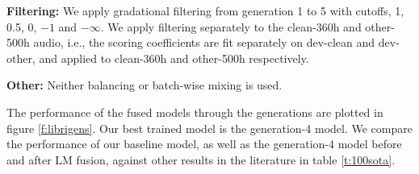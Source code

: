 \documentclass[a4paper]{article}
\begin{document}
\noindent\textbf{Filtering:} We apply gradational filtering from generation 1 to 5 with cutoffs, 1, 0.5, 0, $-1$ and $-\infty$. We apply filtering separately to the clean-360h and other-500h audio, i.e., the scoring coefficients are fit separately on dev-clean and dev-other, and applied to clean-360h and other-500h respectively.

\noindent\textbf{Other:} Neither balancing or batch-wise mixing is used.

The performance of the fused models through the generations are plotted in figure \ref{f:librigens}. Our best trained model is the generation-4 model. We compare the performance of our baseline model, as well as the generation-4 model before and after LM fusion, against other results in the literature in table \ref{t:100sota}.

\begin{table}[h!]
  \vskip -0.05in
  \caption{LibriSpeech 100h WERs (\%).}
  \label{t:100sota}
  \vskip -0.05in
  \centering
  \small
  \vskip -0.1in
\end{table}
\end{document}
